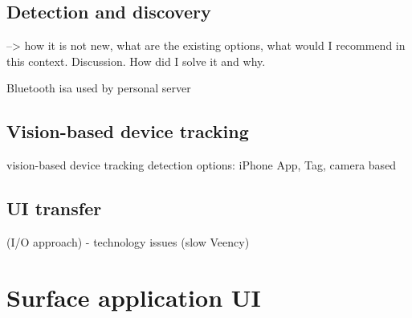 \subsection{Detection and discovery}

--> how it is not new, what are the existing options, what would I recommend in this context. Discussion. How did I solve it and why.

Bluetooth isa used by personal server

\subsection{Vision-based device tracking}
vision-based device tracking
detection options: iPhone App, Tag, camera based 

\subsection{UI transfer}
 (I/O approach)
- technology issues (slow Veency)

\section{Surface application UI}

\subsection{}



